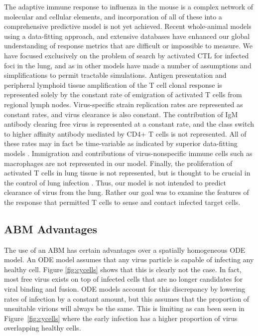 \documentclass[10pt]{article}
\begin{document}
The adaptive immune response to influenza in the mouse is a complex network of molecular and cellular elements, and incorporation of all of these into a comprehensive predictive model is not yet achieved.  Recent whole-animal models using a data-fitting approach, and extensive databases have enhanced our global understanding of response metrics that are difficult or impossible to measure.  We have focused exclusively on the problem of search by activated CTL for infected foci in the lung, and as in other models have made a number of assumptions and simplifications to permit tractable simulations.  Antigen presentation and peripheral lymphoid tissue amplification of the T cell clonal response is represented solely by the constant rate of emigration of activated T cells from regional lymph nodes.  Virus-specific strain replication rates are represented as constant rates, and virus clearance is also constant.  The contribution of IgM antibody clearing free virus is represented at a constant rate, and the class switch to higher affinity antibody mediated by CD4+ T cells is not represented.  All of these rates may in fact be time-variable as indicated by superior data-fitting models \cite{Wu2011}.  Immigration and contributions of virus-nonspecific immune cells such as macrophages are not represented in our model.  Finally, the proliferation of activated T cells in lung tissue is not represented, but is thought to be crucial in the control of lung infection \cite{Miao2010}.  Thus, our model is not intended to predict clearance of virus from the lung.  Rather our goal was to examine the features of the response that permitted T cells to sense and contact infected target cells.


\subsection*{ABM Advantages}

The use of an ABM has certain advantages over a spatially homogeneous ODE model.  An ODE model assumes that any virus particle is capable of infecting any healthy cell.  Figure \ref{fig:cycells} shows that this is clearly not the case.  In fact, most free virus exists on top of infected cells that are no longer candidates for viral binding and fusion.  ODE models account for this discrepancy by lowering rates of infection by a constant amount, but this assumes that the proportion of unsuitable virions will always be the same.  This is limiting as can been seen in Figure~\ref{fig:cycells} where the early infection has a higher proportion of virus overlapping healthy cells.
\end{document}
